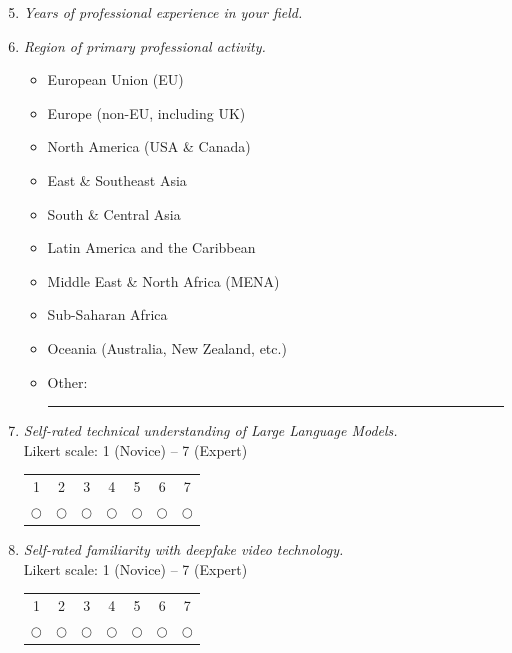 \begin{enumerate}[label=\textbf{Q\arabic*.}, leftmargin=3em]
\setcounter{enumi}{4}

    \item[*] \textit{Years of professional experience in your field.}\\[2pt]
    \framebox[4cm]{\rule{0pt}{1em}}

    \item[*] \textit{Region of primary professional activity.}
    \begin{itemize}
        \item[$\bigcirc$] European Union (EU)
        \item[$\bigcirc$] Europe (non-EU, including UK)
        \item[$\bigcirc$] North America (USA \& Canada)
        \item[$\bigcirc$] East \& Southeast Asia
        \item[$\bigcirc$] South \& Central Asia
        \item[$\bigcirc$] Latin America and the Caribbean
        \item[$\bigcirc$] Middle East \& North Africa (MENA)
        \item[$\bigcirc$] Sub-Saharan Africa
        \item[$\bigcirc$] Oceania (Australia, New Zealand, etc.)
        \item[$\bigcirc$] Other: \rule{5cm}{0.4pt}
    \end{itemize}

    \item[*] \textit{Self-rated technical understanding of Large Language Models.}\\[2pt]
    \noindent Likert scale: 1 (Novice) -- 7 (Expert)\\
    \begin{tabular}{ccccccc}
    1 & 2 & 3 & 4 & 5 & 6 & 7 \\
    $\bigcirc$ & $\bigcirc$ & $\bigcirc$ & $\bigcirc$ & $\bigcirc$ & $\bigcirc$ & $\bigcirc$
    \end{tabular}

    \item[*] \textit{Self-rated familiarity with deepfake video technology.}\\[2pt]
    \noindent Likert scale: 1 (Novice) -- 7 (Expert)\\
    \begin{tabular}{ccccccc}
    1 & 2 & 3 & 4 & 5 & 6 & 7 \\
    $\bigcirc$ & $\bigcirc$ & $\bigcirc$ & $\bigcirc$ & $\bigcirc$ & $\bigcirc$ & $\bigcirc$
    \end{tabular}

\end{enumerate}

